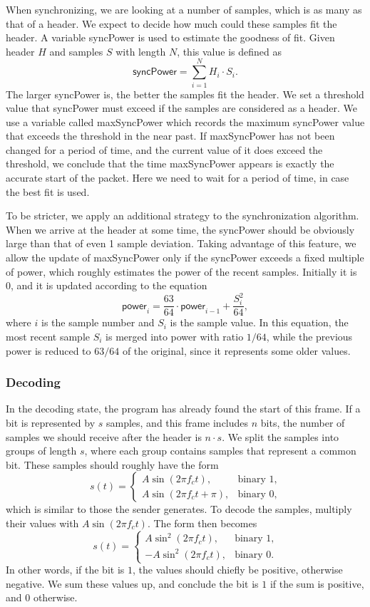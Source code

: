 \documentclass[11pt, conference]{IEEEtran}
\begin{document}
When synchronizing, we are looking at a number of samples, which is as many as that of a header. We expect to decide how much could these samples fit the header. A variable \textsf{syncPower} is used to estimate the goodness of fit. Given header $H$ and samples $S$ with length $N$, this value is defined as
\[
\textsf{syncPower} = \sum_{i=1}^N H_i \cdot S_i.
\]
The larger \textsf{syncPower} is, the better the samples fit the header. We set a threshold value that \textsf{syncPower} must exceed if the samples are considered as a header. We use a variable called \textsf{maxSyncPower} which records the maximum \textsf{syncPower} value that exceeds the threshold in the near past. If \textsf{maxSyncPower} has not been changed for a period of time, and the current value of it does exceed the threshold, we conclude that the time \textsf{maxSyncPower} appears is exactly the accurate start of the packet. Here we need to wait for a period of time, in case the best fit is used.

To be stricter, we apply an additional strategy to the synchronization algorithm. When we arrive at the header at some time, the \textsf{syncPower} should be obviously large than that of even 1 sample deviation. Taking advantage of this feature, we allow the update of \textsf{maxSyncPower} only if the \textsf{syncPower} exceeds a fixed multiple of \textsf{power}, which roughly estimates the power of the recent samples. Initially it is $0$, and it is updated according to the equation
\[
\textsf{power}_i = \frac{63}{64} \cdot \textsf{power}_{i-1} + \frac{S_i^2}{64},
\]
where $i$ is the sample number and $S_i$ is the sample value. In this equation, the most recent sample $S_i$ is merged into \textsf{power} with ratio $1/64$, while the previous \textsf{power} is reduced to $63/64$ of the original, since it represents some older values.

\subsubsection{Decoding}

In the decoding state, the program has already found the start of this frame. If a bit is represented by $s$ samples, and this frame includes $n$ bits, the number of samples we should receive after the header is $n \cdot s$. We split the samples into groups of length $s$, where each group contains samples that represent a common bit. These samples should roughly have the form
\[
s(t) =
\begin{cases}
A\sin(2\pi f_ct), & \text{binary 1}, \\
A\sin(2\pi f_ct + \pi), & \text{binary 0},
\end{cases}
\]
which is similar to those the sender generates. To decode the samples, multiply their values with $A\sin(2\pi f_ct)$. The form then becomes
\[
s(t) =
\begin{cases}
A\sin^2(2\pi f_ct), & \text{binary 1}, \\
-A\sin^2(2\pi f_ct), & \text{binary 0}.
\end{cases}
\]
In other words, if the bit is $1$, the values should chiefly be positive, otherwise negative. We sum these values up, and conclude the bit is $1$ if the sum is positive, and $0$ otherwise.
\end{document}
